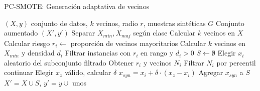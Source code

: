 \documentclass{article}
\begin{document}
\begin{algorithm}
\caption{PC-SMOTE: Generación adaptativa de vecinos}
\begin{algorithmic}[1]
\Require $(X, y)$ conjunto de datos, $k$ vecinos, radio $r$, muestras sintéticas $G$
\Ensure Conjunto aumentado $(X', y')$
\State Separar $X_{min}, X_{maj}$ según clase
    \State Calcular $k$ vecinos en $X$
    \State Calcular riesgo $r_i \gets$ proporción de vecinos mayoritarios
    \State Calcular $k$ vecinos en $X_{min}$ y densidad $d_i$
\EndFor
\State Filtrar instancias con $r_i$ en rango y $d_i > 0$
\State $S \gets \emptyset$
    \State Elegir $x_i$ aleatorio del subconjunto filtrado
    \State Obtener $r_i$ y vecinos $N_i$
    \State Filtrar $N_i$ por percentil
        \State continuar
    \EndIf
    \State Elegir $x_z$ válido, calcular $\delta$
    \State $x_{syn} = x_i + \delta \cdot (x_z - x_i)$
    \State Agregar $x_{syn}$ a $S$
\EndFor
\State \Return $X' = X \cup S$, $y' = y \cup$ unos
\end{algorithmic}
\end{algorithm}
\end{document}
